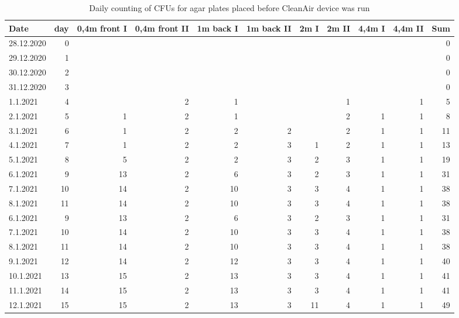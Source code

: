 \documentclass[hyperref]{labbook}
\begin{document}
\begin{table}[H]
\tiny
\begin{tabular}{|l r | rrrrrrrrr|}\hline
Date      &day&0,4m front I&0,4m front II&1m back I&1m back II&2m I&2m II&4,4m I&4,4m II&Sum\\\hline
28.12.2020&0  &            &             &           &            &    &     &      &       &0  \\
29.12.2020&1  &            &             &           &            &    &     &      &       &0  \\
30.12.2020&2  &            &             &           &            &    &     &      &       &0  \\
31.12.2020&3  &            &             &           &            &    &     &      &       &0  \\
1.1.2021  &4  &            &2            &1          &            &    &1    &      &1      &5  \\
2.1.2021  &5  &1           &2            &1          &            &    &2    &1     &1      &8  \\
3.1.2021  &6  &1           &2            &2          &2           &    &2    &1     &1      &11 \\
4.1.2021  &7  &1           &2            &2          &3           &1   &2    &1     &1      &13 \\
5.1.2021  &8  &5           &2            &2          &3           &2   &3    &1     &1      &19 \\
6.1.2021  &9  &13          &2            &6          &3           &2   &3    &1     &1      &31 \\
7.1.2021  &10 &14          &2            &10         &3           &3   &4    &1     &1      &38 \\
8.1.2021  &11 &14          &2            &10         &3           &3   &4    &1     &1      &38 \\
6.1.2021  &9  &13          &2            &6          &3           &2   &3    &1     &1      &31 \\
7.1.2021  &10 &14          &2            &10         &3           &3   &4    &1     &1      &38 \\
8.1.2021  &11 &14          &2            &10         &3           &3   &4    &1     &1      &38 \\
9.1.2021  &12 &14          &2            &12         &3           &3   &4    &1     &1      &40 \\
10.1.2021 &13 &15          &2            &13         &3           &3   &4    &1     &1      &41 \\
11.1.2021 &14 &15          &2            &13         &3           &3   &4    &1     &1      &41 \\
12.1.2021 &15 &15          &2            &13         &3           &11  &4    &1     &1      &49 \\\hline
\end{tabular}
\caption{Daily counting of CFUs for agar plates placed before CleanAir device was run}
\end{table}
\end{document}

